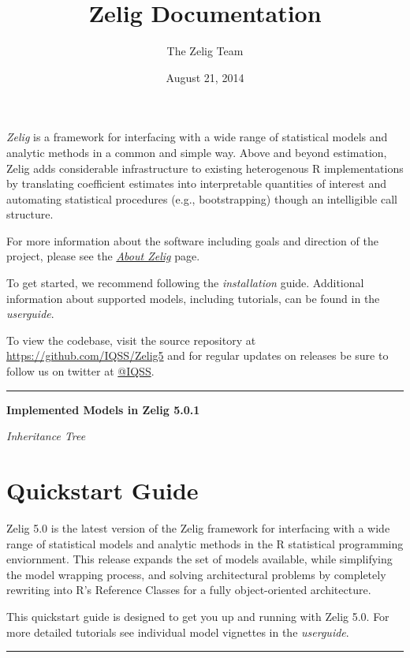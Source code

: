 \documentclass[letterpaper,10pt,english]{sphinxmanual}
\title{Zelig Documentation}
\date{August 21, 2014}
\author{The Zelig Team}
\begin{document}
\maketitle
\tableofcontents
{}\label{index::doc}


\emph{Zelig} is a framework for interfacing with a wide range of statistical models and analytic methods in a common and simple way. Above and beyond estimation, Zelig adds considerable infrastructure to existing heterogenous R implementations by translating coefficient estimates into interpretable quantities of interest and automating statistical procedures (e.g., bootstrapping) though an intelligible call structure.

For more information about the software including goals and direction of the project, please see the {\hyperref[about:about]{\emph{About Zelig}}} page.

To get started, we recommend following the \emph{installation} guide. Additional information about supported models, including tutorials, can be found in the \emph{userguide}.

To view the codebase, visit the source repository at \href{https://github.com/IQSS/Zelig5}{https://github.com/IQSS/Zelig5} and for regular updates on releases be sure to follow us on twitter at \href{https://twitter.com/IQSS}{@IQSS}.


\bigskip\hrule{}\bigskip


\textbf{Implemented Models in Zelig 5.0.1}

\emph{Inheritance Tree}


\chapter{Quickstart Guide}
\label{quickstart:quickstart-guide}\label{quickstart::doc}\label{quickstart:welcome-to-zelig}\label{quickstart:quickstart}
Zelig 5.0 is the latest version of the Zelig framework for interfacing with a wide range of statistical models and analytic methods in the R statistical programming enviornment. This release expands the set of models available, while simplifying the model wrapping process, and solving architectural problems by completely rewriting into R’s Reference Classes for a fully object-oriented architecture.

This quickstart guide is designed to get you up and running with Zelig 5.0. For more detailed tutorials see individual model vignettes in the \emph{userguide}.


\bigskip\hrule{}\bigskip
\end{document}
